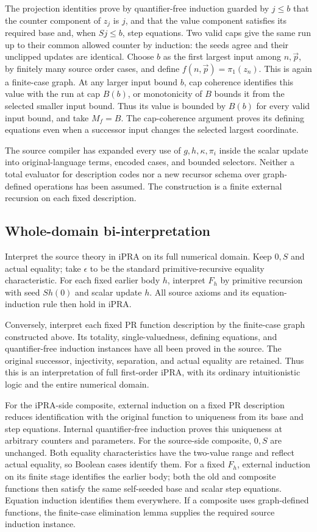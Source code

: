 \documentclass[11pt,letterpaper]{article}
\theoremstyle{definition}\newtheorem{definition}[theorem]{Definition}
\theoremstyle{remark}\newtheorem{remark}[theorem]{Remark}
\begin{document}
The projection identities prove by quantifier-free induction guarded
by $j\le b$ that the counter component of $z_j$ is $j$, and that the
value component satisfies its required base and, when $Sj\le b$,
step equations. Two valid caps
give the same run up to their common allowed counter by induction:
the seeds agree and their unclipped updates are identical. Choose
$b$ as the first largest input among $n,\vec p$, by finitely many
source order cases, and define $f(n,\vec p)=\pi_1(z_n)$. This is
again a finite-case graph. At any larger input bound $b$, cap coherence
identifies this value with the run at cap $B(b)$, or monotonicity of
$B$ bounds it from the selected smaller input bound. Thus its value
is bounded by $B(b)$ for every valid input bound, and take $M_f=B$.
The cap-coherence argument proves its defining equations
even when a successor input changes the selected largest coordinate.

The source compiler has expanded every use of $g,h,\kappa,\pi_i$
inside the scalar update into original-language terms, encoded cases,
and bounded selectors. Neither a total evaluator for description
codes nor a new recursor schema over graph-defined operations has
been assumed. The construction is a finite external recursion on
each fixed description.

\subsection{Whole-domain bi-interpretation}
Interpret the source theory in iPRA on its full numerical domain.
Keep $0,S$ and actual equality; take $\epsilon$ to be the standard
primitive-recursive equality characteristic. For each fixed earlier
body $h$, interpret $F_h$ by primitive recursion with seed $S h(0)$
and scalar update $h$. All source axioms and its equation-induction
rule then hold in iPRA.

Conversely, interpret each fixed PR function description by the
finite-case graph constructed above. Its totality, single-valuedness,
defining equations, and quantifier-free induction instances have all
been proved in the source. The original successor, injectivity,
separation, and actual equality are retained. Thus this is an
interpretation of full first-order iPRA, with its ordinary intuitionistic
logic and the entire numerical domain.

For the iPRA-side composite, external induction on a fixed PR
description reduces identification with the original function to
uniqueness from its base and step equations. Internal quantifier-free
induction proves this uniqueness at arbitrary counters and parameters.
For the source-side composite, $0,S$ are unchanged. Both equality
characteristics have the two-value range and reflect actual equality,
so Boolean cases identify them. For a fixed $F_h$, external induction
on its finite stage identifies the earlier body; both the old and
composite functions then satisfy the same self-seeded base and scalar
step equations. Equation induction identifies them everywhere. If a
composite uses graph-defined functions, the finite-case elimination
lemma supplies the required source induction instance.
\end{document}
